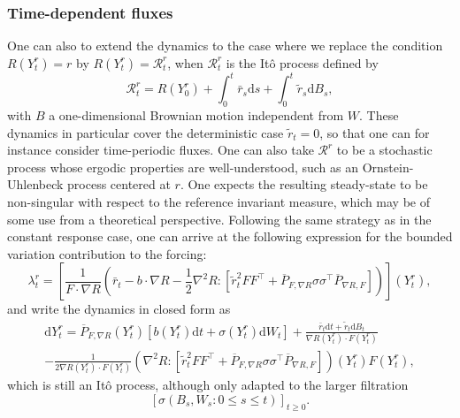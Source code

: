 \documentclass[pdflatex,sn-mathphys]{sn-jnl}%
\theoremstyle{thmstyleone}%
\theoremstyle{thmstyletwo}%
\theoremstyle{thmstylethree}%
\renewcommand{\d}{\mathrm{d}}
\newcommand{\1}{\mathbbm{1}}
\newcommand{\Yr}{Y^r}
\newcommand{\Rr}{\mathcal{R}^r}
\newcommand{\lambdar}{\lambda^r}
\begin{document}
    \subsubsection{Time-dependent fluxes}
    One can also to extend the dynamics to the case where we replace the condition $R(Y_t^r)=r$ by $R(Y_t^r)=\Rr_t$, when $\Rr_t$ is the Itô process defined by
    \begin{equation}  
    \label{eq:norton_sde_R}
    \Rr_t=R(\Yr_0) +\int_0^t \bar{r}_s\d s + \int_0^t \widetilde{r}_s \d B_s,
    \end{equation}
    with $B$ a one-dimensional Brownian motion independent from $W$. These dynamics in particular cover the deterministic case $\widetilde{r}_t = 0$, so that one can for instance consider time-periodic fluxes. One can also take $\Rr$ to be a stochastic process whose ergodic properties are well-understood, such as an Ornstein-Uhlenbeck process centered at $r$. One expects the resulting steady-state to be non-singular with respect to the reference invariant measure, which may be of some use from a theoretical perspective.
    Following the same strategy as in the constant response case, one can arrive at the following expression for the bounded variation contribution to the forcing:
    \begin{equation}
    \label{eq:norton_lambda_t_expr}
    \lambdar_t = \left[\frac1{F\cdot \nabla R}\left(\bar{r}_t-b\cdot \nabla R -\frac12 \nabla^2 R:\left[ \widetilde{r}_t^2 F F^\intercal +\overline{P}_{F,\nabla R} \sigma\sigma ^\intercal \overline{P}_{\nabla R,F}\right]\right)\right](\Yr_t),
    \end{equation}
    and write the dynamics in closed form as
    \begin{multline}
        \d \Yr_t = \overline{P}_{F,\nabla R}(\Yr_t)\left[b(\Yr_t) \d t + \sigma(\Yr_t) \d W_t\right]
        +\frac{\bar{r}_t\d t+\widetilde{r}_t \d B_t}{\nabla R(\Yr_t)\cdot F(\Yr_t)}\\
        -\frac{1}{2\nabla R(\Yr_t)\cdot F(\Yr_t)}\left(\nabla^2 R:\left[ \widetilde{r}_t^2 F F^\intercal +\overline{P}_{F,\nabla R} \sigma\sigma ^\intercal \overline{P}_{\nabla R,F}\right]\right)(\Yr_t)F(\Yr_t),
    \end{multline}
which is still an Itô process, although only adapted to the larger filtration $$\left[\sigma(B_s,W_s : 0\leq s\leq t)\right]_{t\geq 0}.$$
\end{document}
